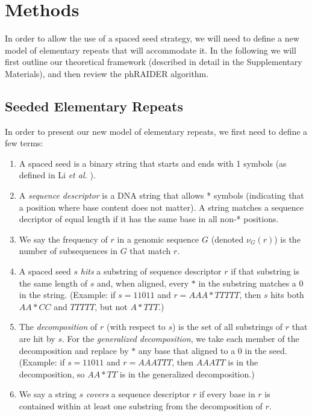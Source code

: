 \documentclass{bmcart}
\begin{document}
\section*{Methods}

In order to allow the use of a spaced seed strategy, we will need to
define a new model of elementary repeats that will accommodate it.  In
the following we will first outline our theoretical framework
(described in detail in the Supplementary Materials), and then review
the phRAIDER algorithm.

\subsection*{Seeded Elementary Repeats}
In order to present our new model of elementary repeats, we first need
to define a few terms:
\begin{enumerate}
  \item A spaced seed is a binary string that starts and ends with 1
    symbols (as defined in Li {\it et al.} \cite{Li:2004wl}).
  \item A {\it sequence descriptor} is a DNA string that allows *
    symbols (indicating that a position where base content does not
    matter).  A string matches a sequence decriptor of equal length if
    it has the same base in all non-* positions.
  \item We say the frequency of $r$ in a genomic sequence $G$ (denoted
    $\nu_G(r)$) is the number of subsequences in $G$ that match $r$.
  \item A spaced seed $s$ {\it hits} a substring of sequence
    descriptor $r$ if that substring is the same length of $s$ and,
    when aligned, every $*$ in the substring matches a 0 in the
    string.  (Example: if $s=11011$ and $r=AAA*TTTTT$, then $s$
    hits both $AA*CC$ and $TTTTT$, but not $A*TTT$.)
  \item The {\it decomposition} of $r$ (with respect to $s$) is the set of all substrings of
    $r$ that are hit by $s$.  For the {\it generalized decomposition},
    we take each member of the decomposition and replace by $*$ any
    base that aligned to a 0 in the seed.  (Example: if $s=11011$ and
    $r=AAATTT$, then $AAATT$ is in the decomposition, so $AA*TT$ is in
    the generalized decomposition.)
  \item We say a string $s$ {\it covers} a sequence descriptor $r$ if
  every base in $r$ is contained within at least one substring from
  the decomposition of $r$.
\end{enumerate}
\end{document}
